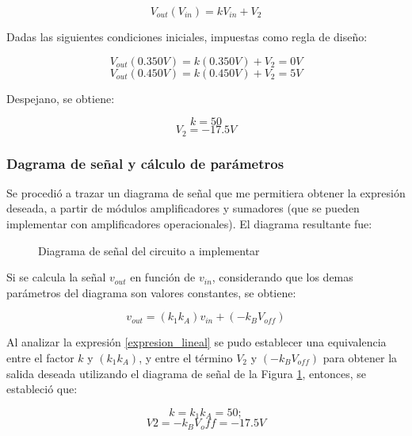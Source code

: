 \begin{equation}
\label{expresion_lineal}
V_{out}(V_{in}) = k V_{in} + V_2
\end{equation}


Dadas las siguientes condiciones iniciales, impuestas como regla de diseño:

\[V_{out}(0.350V) = k(0.350V) + V_2 = 0V\]
\[V_{out}(0.450V) = k(0.450V) + V_2 = 5V\]

Despejano, se obtiene:

\begin{equation}
\label{valor_k}
k = 50
\end{equation}
\begin{equation}
\label{valor_V2}
V_2 = -17.5V
\end{equation}



\subsubsection{Dagrama de señal y cálculo de parámetros}
Se procedió a trazar un diagrama de señal que me permitiera obtener la expresión deseada, a partir de módulos amplificadores y sumadores (que se pueden implementar con amplificadores operacionales). El diagrama resultante fue:

\begin{figure}[H]
\centering

\caption{Diagrama de señal del circuito a implementar}
\label{6_signal_diagram}
\end{figure}

Si se calcula la señal $v_{out}$ en función de $v_{in}$, considerando que los demas parámetros del diagrama son valores constantes, se obtiene:

\begin{equation}
\label{salida_flujo}
v_{out} = (k_1 k_A) v_{in} + (-k_B V_{off})
\end{equation}

Al analizar la expresión \ref{expresion_lineal} se pudo establecer una equivalencia entre el factor $k$ y $(k_1 k_A)$, y entre el término $V_2$ y $(-k_B V_{off})$ para obtener la salida deseada utilizando el diagrama de señal de la Figura \ref{6_signal_diagram}, entonces, se estableció que:

\begin{equation}
\label{k_igualdad}
k = k_1 k_A = 50;
\end{equation}
\begin{equation}
\label{V2_igualdad}
V2 = -k_B V_off = -17.5V
\end{equation}

